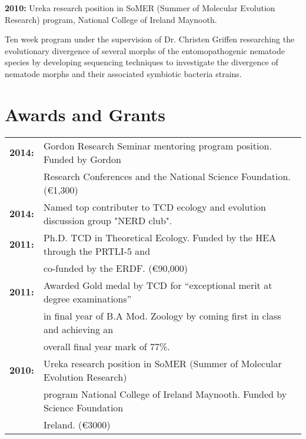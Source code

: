 \documentclass[10pt,a4paper]{article}
\begin{document}
\textbf{2010:} Ureka research position in SoMER (Summer of Molecular Evolution Research) program, National College of Ireland Maynooth.\\
\par{\fontsize{10.5}{10}\selectfont Ten week program under the supervision of Dr. Christen Griffen researching the evolutionary divergence of several morphs of the entomopathogenic nematode species by developing sequencing techniques to investigate the divergence of nematode morphs and their associated symbiotic bacteria strains.\bigskip}



\section{Awards and Grants}

\begin{tabular}{ll}
\textbf{2014:} & Gordon Research Seminar mentoring program position. Funded by Gordon\\
& Research Conferences and the National Science Foundation. (\euro 1,300)\\
\textbf{2014:} & Named top contributer to TCD ecology and evolution discussion group "NERD club".\\
\textbf{2011:} & Ph.D. TCD in Theoretical Ecology. Funded by the HEA through the PRTLI-5 and\\
& co-funded by the ERDF. (\euro 90,000)\\
\textbf{2011:} & Awarded Gold medal by TCD for “exceptional merit at degree examinations”\\
& in final year of B.A Mod. Zoology by coming first in class and achieving an\\
& overall final year mark of 77\%.\\
\textbf{2010:} & Ureka research position in SoMER (Summer of Molecular Evolution Research) \\
& program National College of Ireland Maynooth.  Funded by Science Foundation\\
& Ireland. (\euro 3000)\\ 
\end{tabular}

\bigskip

\end{document}
